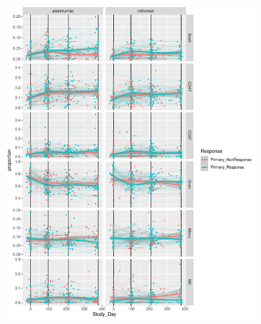 \begin{outline}
\begin{figure}
    \centering
    \includegraphics[width=1.0\textwidth,page=1]{mainmatter/figures/chapter_04/dream.cell_type_proportion_vs_Study_Day.pdf}
    \caption{}
    \label{fig:multipants_cell_type_proportion_vs_Study_Day}
\end{figure}


\end{outline}
